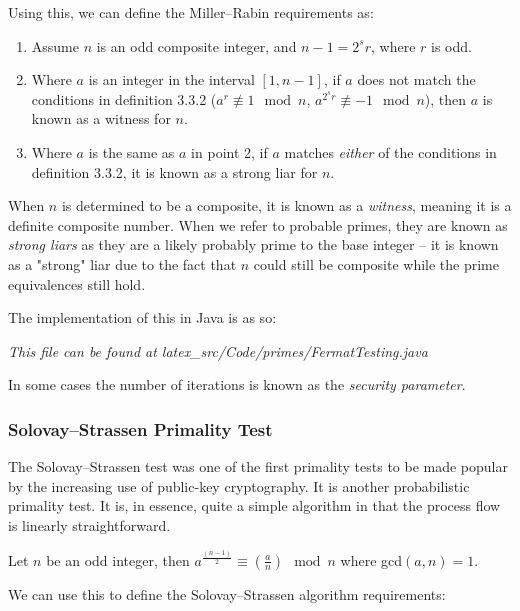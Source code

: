     Using this, we can define the Miller--Rabin requirements as:
    
    \begin{enumerate}
      \item Assume $n$ is an odd composite integer, and $n - 1 = 2^sr$, where $r$ is odd.
      \item Where $a$ is an integer in the interval $[1,n-1]$, if $a$ does not match the conditions in definition 3.3.2 ($a^r \not\equiv1 \mod{n}$,  $a^{2^sr} \not\equiv -1 \mod{n}$), then $a$ is known as a witness for $n$.
      \item Where $a$ is the same as $a$ in point 2, if $a$ matches \emph{either} of the conditions in definition 3.3.2, it is known as a strong liar for $n$.
    \end{enumerate}
    
    When $n$ is determined to be a composite, it is known as a \emph{witness}, meaning it is a definite composite number. When we refer to probable primes, they are known as \emph{strong liars} as they are a likely probably prime to the base integer -- it is known as a "strong" liar due to the fact that $n$ could still be composite while the prime equivalences still hold.
    
    The implementation of this in Java is as so:
    
    
    \emph{This file can be found at latex\_src/Code/primes/FermatTesting.java}
    
    In some cases the number of iterations is known as the \emph{security parameter}.
    
    \subsubsection{Solovay--Strassen Primality Test}
    
    The Solovay--Strassen test was one of the first primality tests to be made popular by the increasing use of public-key cryptography. It is another probabilistic primality test. It is, in essence, quite a simple algorithm in that the process flow is linearly straightforward. \\
    
    \begin{mathdef}
      Let $n$ be an odd integer, then $a^{\frac{(n-1)}{2}} \equiv (\frac{a}{n}) \mod{n}$ where gcd$(a,n) = 1$.
    \end{mathdef}
    
    We can use this to define the Solovay--Strassen algorithm requirements:
    
